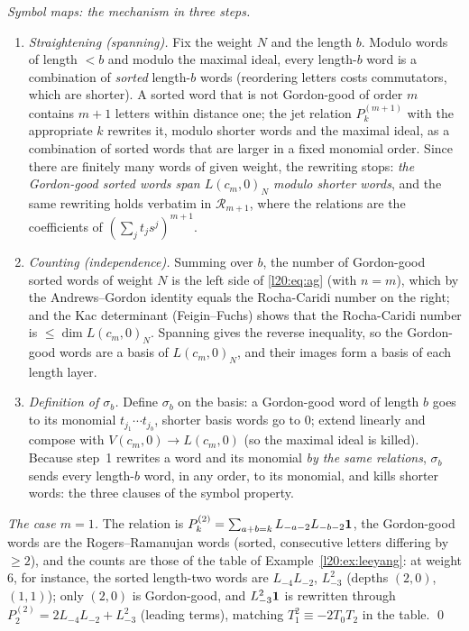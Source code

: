 \emph{Symbol maps: the mechanism in three steps.}
\begin{enumerate}
\item \emph{Straightening (spanning).} Fix the weight $N$ and the length $b$. Modulo words of length $<b$ and modulo the maximal
  ideal, every length-$b$ word is a combination of \emph{sorted} length-$b$ words (reordering letters costs commutators, which are
  shorter). A sorted word that is not Gordon-good of order $m$ contains $m+1$ letters within distance one; the jet relation
  $P^{(m+1)}_k$ with the appropriate $k$ rewrites it, modulo shorter words and the maximal ideal, as a combination of sorted words that
  are larger in a fixed monomial order. Since there are finitely many words of given weight, the rewriting stops: \emph{the Gordon-good
  sorted words span $L(c_m,0)_N$ modulo shorter words}, and the same rewriting holds verbatim in $\mathcal R_{m+1}$, where the relations are
  the coefficients of $(\sum_jt_js^j)^{m+1}$.
\item \emph{Counting (independence).} Summing over $b$, the number of Gordon-good sorted words of weight $N$ is the left side of
  \eqref{l20:eq:ag} (with $n=m$), which by the Andrews--Gordon identity equals the Rocha-Caridi number on the right; and the
  Kac determinant (Feigin--Fuchs) shows that the Rocha-Caridi number is $\le\dim L(c_m,0)_N$. Spanning gives the reverse inequality, so
  the Gordon-good words are a basis of $L(c_m,0)_N$, and their images form a basis of each length layer.
\item \emph{Definition of $\sigma_b$.} Define $\sigma_b$ on the basis: a Gordon-good word of length $b$ goes to its monomial
  $t_{j_1}\cdots t_{j_b}$, shorter basis words go to $0$; extend linearly and compose with $V(c_m,0)\to L(c_m,0)$ (so the maximal ideal
  is killed). Because step~1 rewrites a word and its monomial \emph{by the same relations}, $\sigma_b$ sends every length-$b$ word, in
  any order, to its monomial, and kills shorter words: the three clauses of the symbol property.
\end{enumerate}
\emph{The case $m=1$.} The relation is $P^{(2)}_k=\sum_{a+b=k}L_{-a-2}L_{-b-2}\mathbf{1}$, the Gordon-good words are the
Rogers--Ramanujan words (sorted, consecutive letters differing by $\ge2$), and the counts are those of the table of
Example~\ref{l20:ex:leeyang}: at weight $6$, for instance, the sorted length-two words are $L_{-4}L_{-2}$, $L_{-3}^2$ (depths $(2,0)$,
$(1,1)$); only $(2,0)$ is Gordon-good, and $L_{-3}^2\mathbf{1}$ is rewritten through $P^{(2)}_2 = 2L_{-4}L_{-2}+L_{-3}^2$ (leading terms),
matching $T_1^2\equiv-2T_0T_2$ in the table. \qed

